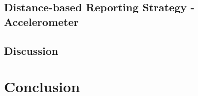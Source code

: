 \documentclass[10pt,a4paper,twocolumn]{article}
\begin{document}
\subsection{Distance-based Reporting Strategy - Accelerometer}


\subsection{Discussion}


\section{Conclusion}

\end{document}
